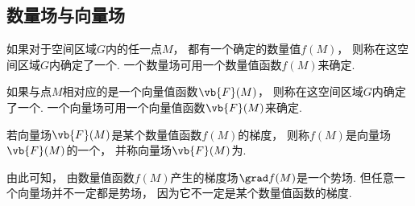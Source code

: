 \subsection{数量场与向量场}
\begin{definition}
如果对于空间区域\(G\)内的任一点\(M\)，
都有一个确定的数量值\(f(M)\)，
则称在这空间区域\(G\)内确定了一个.
一个数量场可用一个数量值函数\(f(M)\)来确定.

如果与点\(M\)相对应的是一个向量值函数\(\vb{F}(M)\)，
则称在这空间区域\(G\)内确定了一个.
一个向量场可用一个向量值函数\(\vb{F}(M)\)来确定.

若向量场\(\vb{F}(M)\)是某个数量值函数\(f(M)\)的梯度，
则称\(f(M)\)是向量场\(\vb{F}(M)\)的一个，
并称向量场\(\vb{F}(M)\)为.
\end{definition}
由此可知，
由数量值函数\(f(M)\)产生的梯度场\(\grad f(M)\)是一个势场.
但任意一个向量场并不一定都是势场，
因为它不一定是某个数量值函数的梯度.
